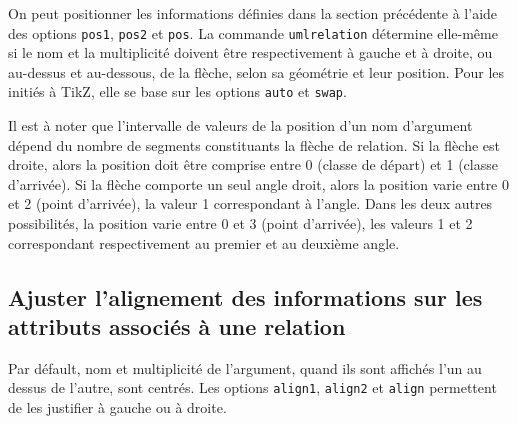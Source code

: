 \documentclass[a4paper,11pt]{report}
\newcommand{\inputTikZ}[1]{%
  }%
\newcommand{\inputTikZ}[1]{%
    \texttt{[image: fig/\#1.pdf]}%
  }%
\begin{document}
On peut positionner les informations définies dans la section précédente à l'aide des options {\tt pos1}, {\tt pos2} et {\tt pos}.
La commande {\tt umlrelation} détermine elle-même si le nom et la multiplicité doivent être respectivement à gauche et à droite, ou au-dessus et au-dessous, de la flèche, selon sa géométrie et leur position. Pour les initiés à TikZ, elle se base sur les options {\tt auto} et {\tt swap}.

\medskip

\begin{minipage}{0.5\textwidth}

\end{minipage}
\begin{minipage}{0.4\textwidth}
\begin{center}
\inputTikZ{figure17}
\end{center}
\end{minipage}

\medskip

Il est à noter que l'intervalle de valeurs de la position d'un nom d'argument dépend du nombre de segments constituants la flèche de relation. Si la flèche est droite, alors la position doit être comprise entre 0 (classe de départ) et 1 (classe d'arrivée). Si la flèche comporte un seul angle droit, alors la position varie entre 0 et 2 (point d'arrivée), la valeur 1 correspondant à l'angle. Dans les deux autres possibilités, la position varie entre 0 et 3 (point d'arrivée), les valeurs 1 et 2 correspondant respectivement au premier et au deuxième angle.

\subsection{Ajuster l'alignement des informations sur les attributs associés à une relation}\label{ss.relalign}

Par défault, nom et multiplicité de l'argument, quand ils sont affichés l'un au dessus de l'autre, sont centrés. Les options {\tt align1}, {\tt align2} et {\tt align} permettent de les justifier à gauche ou à droite.

\medskip

\begin{minipage}{0.5\textwidth}

\end{minipage}
\begin{minipage}{0.4\textwidth}
\begin{center}
\inputTikZ{figure18}
\end{center}
\end{minipage}
\end{document}

